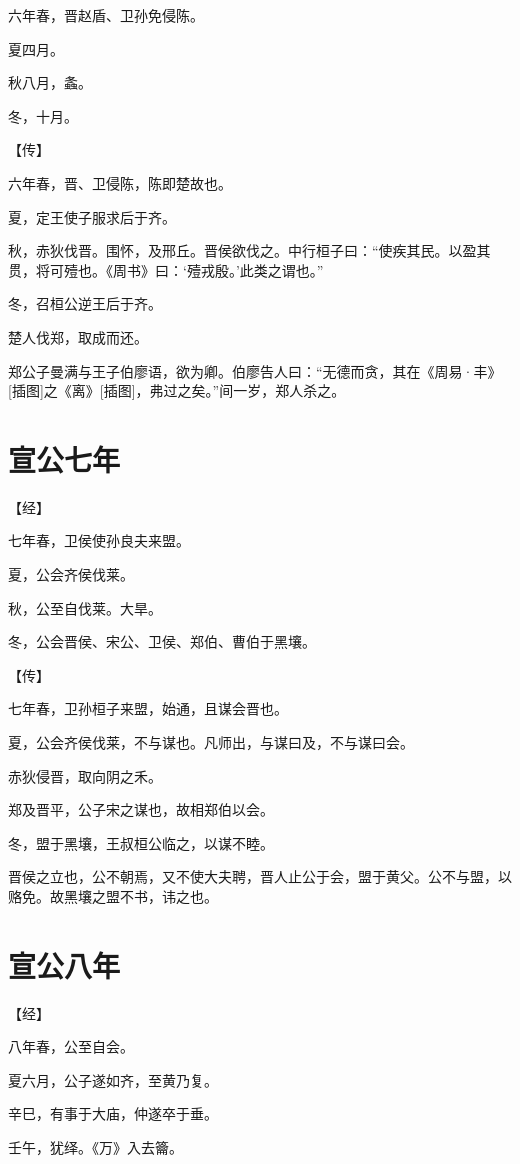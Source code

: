 \documentclass[a4paper,12pt,UTF8,twoside]{ctexbook}
\begin{document}
六年春，晋赵盾、卫孙免侵陈。

夏四月。

秋八月，螽。

冬，十月。

【传】

六年春，晋、卫侵陈，陈即楚故也。

夏，定王使子服求后于齐。

秋，赤狄伐晋。围怀，及邢丘。晋侯欲伐之。中行桓子曰：“使疾其民。以盈其贯，将可殪也。《周书》曰：‘殪戎殷。’此类之谓也。”

冬，召桓公逆王后于齐。

楚人伐郑，取成而还。

郑公子曼满与王子伯廖语，欲为卿。伯廖告人曰：“无德而贪，其在《周易·丰》[插图]之《离》[插图]，弗过之矣。”间一岁，郑人杀之。

\section{宣公七年}



【经】

七年春，卫侯使孙良夫来盟。

夏，公会齐侯伐莱。

秋，公至自伐莱。大旱。

冬，公会晋侯、宋公、卫侯、郑伯、曹伯于黑壤。

【传】

七年春，卫孙桓子来盟，始通，且谋会晋也。

夏，公会齐侯伐莱，不与谋也。凡师出，与谋曰及，不与谋曰会。

赤狄侵晋，取向阴之禾。

郑及晋平，公子宋之谋也，故相郑伯以会。

冬，盟于黑壤，王叔桓公临之，以谋不睦。

晋侯之立也，公不朝焉，又不使大夫聘，晋人止公于会，盟于黄父。公不与盟，以赂免。故黑壤之盟不书，讳之也。

\section{宣公八年}



【经】

八年春，公至自会。

夏六月，公子遂如齐，至黄乃复。

辛巳，有事于大庙，仲遂卒于垂。

壬午，犹绎。《万》入去籥。
\end{document}

